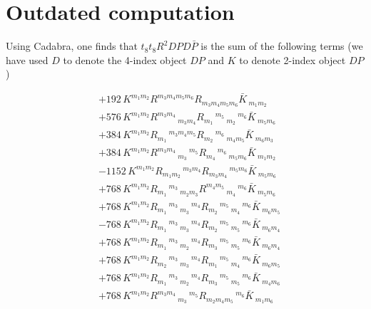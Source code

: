 \section{Outdated computation}

Using Cadabra, one finds that $t_8 t_8 R^2 DP D\bar{P}$ is the sum of the following terms (we have used $D$ to denote the 4-index object $DP$ and $K$ to denote 2-index object $DP$)


\begin{align}
  &+192\,K^{{m_{1}} {m_{2}}} R^{{m_{3}} {m_{4}} {m_{5}} {m_{6}}} R_{{m_{3}} {m_{4}} {m_{5}} {m_{6}}} \bar{K}\,_{{m_{1}} {m_{2}}}\\
  &+576\,K^{{m_{1}} {m_{2}}} R^{{m_{3}} {m_{4}}}\,_{{m_{3}} {m_{4}}} R_{{m_{1}}}\,^{{m_{5}}}\,_{{m_{2}}}\,^{{m_{6}}} \bar{K}\,_{{m_{5}} {m_{6}}}\\
  &+384\,K^{{m_{1}} {m_{2}}} R_{{m_{1}}}\,^{{m_{3}} {m_{4}} {m_{5}}} R_{{m_{2}}}\,^{{m_{6}}}\,_{{m_{4}} {m_{5}}} \bar{K}\,_{{m_{6}} {m_{3}}}\\
  &+384\,K^{{m_{1}} {m_{2}}} R^{{m_{3}} {m_{4}}}\,_{{m_{3}}}\,^{{m_{5}}} R_{{m_{4}}}\,^{{m_{6}}}\,_{{m_{5}} {m_{6}}} \bar{K}\,_{{m_{1}} {m_{2}}}\\
  &-1152\,K^{{m_{1}} {m_{2}}} R_{{m_{1}} {m_{2}}}\,^{{m_{3}} {m_{4}}} R_{{m_{3}} {m_{4}}}\,^{{m_{5}} {m_{6}}} \bar{K}\,_{{m_{5}} {m_{6}}}\\
  &+768\,K^{{m_{1}} {m_{2}}} R_{{m_{1}}}\,^{{m_{3}}}\,_{{m_{2}} {m_{3}}} R^{{m_{4}} {m_{5}}}\,_{{m_{4}}}\,^{{m_{6}}} \bar{K}\,_{{m_{5}} {m_{6}}}\\
  &+768\,K^{{m_{1}} {m_{2}}} R_{{m_{1}}}\,^{{m_{3}}}\,_{{m_{3}}}\,^{{m_{4}}} R_{{m_{2}}}\,^{{m_{5}}}\,_{{m_{4}}}\,^{{m_{6}}} \bar{K}\,_{{m_{6}} {m_{5}}}\\
  &-768\,K^{{m_{1}} {m_{2}}} R_{{m_{1}}}\,^{{m_{3}}}\,_{{m_{3}}}\,^{{m_{4}}} R_{{m_{2}}}\,^{{m_{5}}}\,_{{m_{5}}}\,^{{m_{6}}} \bar{K}\,_{{m_{6}} {m_{4}}}\\
  &+768\,K^{{m_{1}} {m_{2}}} R_{{m_{1}}}\,^{{m_{3}}}\,_{{m_{2}}}\,^{{m_{4}}} R_{{m_{3}}}\,^{{m_{5}}}\,_{{m_{5}}}\,^{{m_{6}}} \bar{K}\,_{{m_{6}} {m_{4}}}\\
  &+768\,K^{{m_{1}} {m_{2}}} R_{{m_{2}}}\,^{{m_{3}}}\,_{{m_{3}}}\,^{{m_{4}}} R_{{m_{1}}}\,^{{m_{5}}}\,_{{m_{4}}}\,^{{m_{6}}} \bar{K}\,_{{m_{6}} {m_{5}}}\\
  &+768\,K^{{m_{1}} {m_{2}}} R_{{m_{1}}}\,^{{m_{3}}}\,_{{m_{2}}}\,^{{m_{4}}} R_{{m_{3}}}\,^{{m_{5}}}\,_{{m_{5}}}\,^{{m_{6}}} \bar{K}\,_{{m_{4}} {m_{6}}}\\
  &+768\,K^{{m_{1}} {m_{2}}} R^{{m_{3}} {m_{4}}}\,_{{m_{3}}}\,^{{m_{5}}} R_{{m_{2}} {m_{4}} {m_{5}}}\,^{{m_{6}}} \bar{K}\,_{{m_{1}} {m_{6}}}\\

\end{align}
